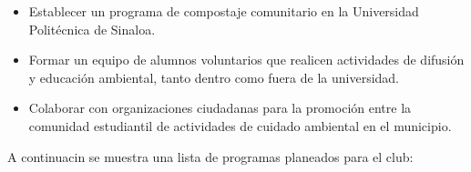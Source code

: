 \begin{itemize}
    \item Establecer un programa de compostaje comunitario en la Universidad Politécnica de Sinaloa. 
    \item Formar un equipo de alumnos voluntarios que realicen actividades de difusión y educación ambiental, tanto dentro como fuera de la universidad. 
    \item Colaborar con organizaciones ciudadanas para la promoción entre la comunidad estudiantil de actividades de cuidado ambiental en el municipio. 
\end{itemize}

A continuacin se muestra una lista de programas planeados para el club:

    

